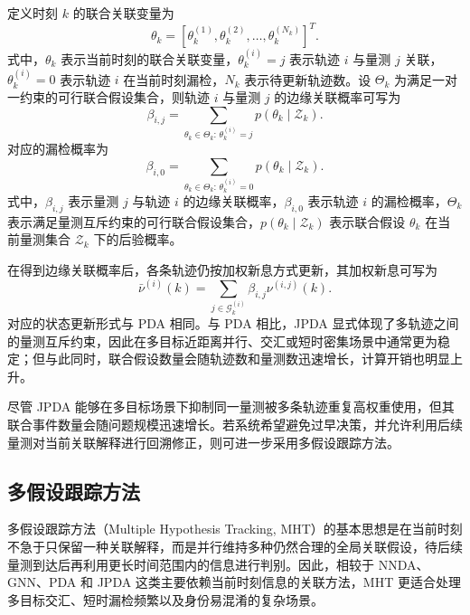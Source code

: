 \documentclass{xdupgthesis}
\begin{document}
定义时刻 $k$ 的联合关联变量为
\begin{equation}
	\theta_k
	=
	\left[
	\theta_k^{(1)},\theta_k^{(2)},\ldots,\theta_k^{(N_k)}
	\right]^{T}.
\end{equation}
式中，$\theta_k$ 表示当前时刻的联合关联变量，$\theta_k^{(i)}=j$ 表示轨迹 $i$ 与量测 $j$ 关联，$\theta_k^{(i)}=0$ 表示轨迹 $i$ 在当前时刻漏检，$N_k$ 表示待更新轨迹数。设 $\Theta_k$ 为满足一对一约束的可行联合假设集合，则轨迹 $i$ 与量测 $j$ 的边缘关联概率可写为
\begin{equation}
	\beta_{i,j}
	=
	\sum_{\theta_k\in\Theta_k:\,\theta_k^{(i)}=j}
	p\!\left(
	\theta_k\mid\mathcal{Z}_k
	\right).
\end{equation}
对应的漏检概率为
\begin{equation}
	\beta_{i,0}
	=
	\sum_{\theta_k\in\Theta_k:\,\theta_k^{(i)}=0}
	p\!\left(
	\theta_k\mid\mathcal{Z}_k
	\right).
\end{equation}
式中，$\beta_{i,j}$ 表示量测 $j$ 与轨迹 $i$ 的边缘关联概率，$\beta_{i,0}$ 表示轨迹 $i$ 的漏检概率，$\Theta_k$ 表示满足量测互斥约束的可行联合假设集合，$p(\theta_k\mid\mathcal{Z}_k)$ 表示联合假设 $\theta_k$ 在当前量测集合 $\mathcal{Z}_k$ 下的后验概率。

在得到边缘关联概率后，各条轨迹仍按加权新息方式更新，其加权新息可写为
\begin{equation}
	\bar{\nu}^{(i)}(k)
	=
	\sum_{j\in\mathcal{G}^{(i)}_k}
	\beta_{i,j}\nu^{(i,j)}(k).
\end{equation}
对应的状态更新形式与 PDA 相同。与 PDA 相比，JPDA 显式体现了多轨迹之间的量测互斥约束，因此在多目标近距离并行、交汇或短时密集场景中通常更为稳定；但与此同时，联合假设数量会随轨迹数和量测数迅速增长，计算开销也明显上升。

尽管 JPDA 能够在多目标场景下抑制同一量测被多条轨迹重复高权重使用，但其联合事件数量会随问题规模迅速增长。若系统希望避免过早决策，并允许利用后续量测对当前关联解释进行回溯修正，则可进一步采用多假设跟踪方法。


\subsection{多假设跟踪方法}

多假设跟踪方法（Multiple Hypothesis Tracking, MHT）的基本思想是在当前时刻不急于只保留一种关联解释，而是并行维持多种仍然合理的全局关联假设，待后续量测到达后再利用更长时间范围内的信息进行判别\cite{gui2022doubleloopmht}。因此，相较于 NNDA、GNN、PDA 和 JPDA 这类主要依赖当前时刻信息的关联方法，MHT 更适合处理多目标交汇、短时漏检频繁以及身份易混淆的复杂场景。
\end{document}
